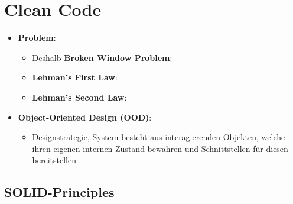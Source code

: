 \section{Clean Code}
\label{cc:sec:clean_code}

\begin{itemize}
\item \textbf{Problem}:
	\begin{itemize}
		\item Deshalb \textbf{Broken Window Problem}: 
		\item \textbf{Lehman's First Law}: 
		\item \textbf{Lehman's Second Law}: 
	\end{itemize}
\item \textbf{Object-Oriented Design (OOD)}:
	\begin{itemize}
		\item Designstrategie, System besteht aus interagierenden Objekten, welche ihren eigenen internen Zustand bewahren und Schnittstellen für diesen bereitstellen
	\end{itemize}
\end{itemize}

\subsection{SOLID-Principles}
\label{cc:sub:solid_principles}

